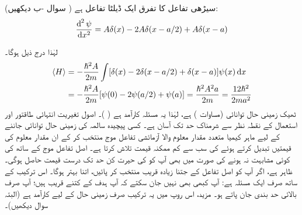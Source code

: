  

 سیڑھی تفاعل کا تفرق ایک ڈیلٹا تفاعل ہے ( سوال -ب دیکھیں):
\begin{align}
\frac{\dif^{\,2}{\psi}}{\dif{x^{2}}}=A\delta(x)-2A\delta(x-a/2)+A\delta(x-a)
\end{align}

 لہٰذا درج ذیل ہوگا۔
\begin{align} 
\langle H \rangle &= -\frac{\hslash^{2}A}{2m}\int[\delta(x)-2\delta(x-a/2)+\delta(x-a)]\psi(x)\dif{x}\nonumber\\
&= -\frac{\hslash^{2}A}{2m}[\psi(0)-2\psi(a/2)+\psi(a)]=\frac{\hslash^{2}A^{2}a}{2m}=\frac{12\hslash^{2}}{2ma^{2}}
\end{align}
 ٹھیک زمینی حال توانائی  (مساوات ) ہے، لہٰذا یہ مسئلہ کارآمد ہے ( )۔
اصول تغیریت انتہائی طاقتور اور استعمال کے نقطہ نظر سے شرمناک حد تک آسان ہے۔ کسی پیچیدہ سالمہ کی زمینی حال توانائی جاننے کے لیے ماہر کیمیا متعدد مقدار معلوم والا آزمائشی تفاعل موج منتخب کر کے ان مقدار معلوم کی قیمتیں تبدیل کرتے ہوئے  کی سب سے کم ممکنہ قیمت تلاش کرتا ہے۔ اصل تفاعل موج کے ساتھ  کی کوئی مشابہت نہ ہونے کی صورت میں بھی آپ کو  کی حیرت کن حد تک درست قیمت حاصل ہوگی۔ ظاہر ہے، اگر آپ  کو اصل تفاعل کے جتنا زیادہ قریب منتخب کر پائیں، اتنا بہتر ہوگا۔ اس ترکیب کے ساتھ صرف ایک مسئلہ ہے: آپ کبھی بھی نہیں جان سکتے کہ آپ ہدف کے کتنے قریب ہیں؛ آپ صرف بالائی حد بندی جان پاتے ہو۔ مزید، اس روپ میں یہ ترکیب صرف زمینی حال کے لیے کارآمد ہے (البتہ سوال  دیکھیں)۔

